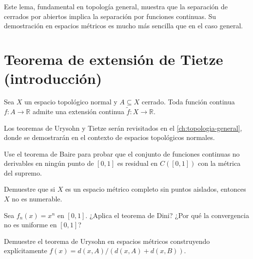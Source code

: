 Este lema, fundamental en topología general, muestra que la separación de cerrados por abiertos implica la separación por funciones continuas. Su demostración en espacios métricos es mucho más sencilla que en el caso general.

\section{Teorema de extensión de Tietze (introducción)}

\begin{theorem}
\label{teo:tietze}
Sea $X$ un espacio topológico normal y $A\subseteq X$ cerrado. Toda función continua $f\colon A\to\mathbb{R}$ admite una extensión continua $\widetilde{f}\colon X\to\mathbb{R}$.
\end{theorem}

\begin{remark}
Los teoremas de Urysohn y Tietze serán revisitados en el \cref{ch:topologia-general}, donde se demostrarán en el contexto de espacios topológicos normales.
\end{remark}

\begin{exercise}
Use el teorema de Baire para probar que el conjunto de funciones continuas no derivables en ningún punto de $[0,1]$ es residual en $C([0,1])$ con la métrica del supremo.
\end{exercise}

\begin{exercise}
Demuestre que si $X$ es un espacio métrico completo sin puntos aislados, entonces $X$ no es numerable.
\end{exercise}

\begin{exercise}
Sea $f_n(x)=x^n$ en $[0,1]$. ¿Aplica el teorema de Dini? ¿Por qué la convergencia no es uniforme en $[0,1]$?
\end{exercise}

\begin{problem}
Demuestre el teorema de Urysohn en espacios métricos construyendo explícitamente $f(x)=d(x,A)/(d(x,A)+d(x,B))$.
\end{problem}
